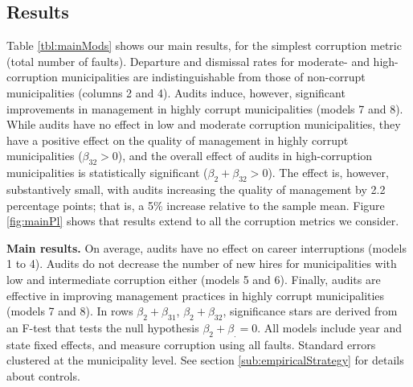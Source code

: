 \documentclass[12pt,a4paper]{article}
\theoremstyle{definition}
\begin{document}
\subsection{Results}
\label{sub:results}

Table \ref{tbl:mainMods} shows our main results, for the simplest corruption metric (total number of faults). Departure and dismissal rates for moderate- and high-corruption municipalities are indistinguishable from those of non-corrupt municipalities (columns 2 and 4). %
Audits induce, however, significant improvements in management in highly corrupt municipalities (models 7 and 8). While audits have no effect in low and moderate corruption municipalities, they have a positive effect on the quality of management in highly corrupt municipalities ($\beta_{32} > 0$), and the overall effect of audits in high-corruption municipalities is statistically significant ($\beta_2 + \beta_{32} > 0$). The effect is, however, substantively small, with audits increasing the quality of management by 2.2 percentage points; that is, a 5\% increase relative to the sample mean. Figure \ref{fig:mainPl} shows that results extend to all the corruption metrics we consider. 

\begin{landscape}
    \begin{table}[t]
        \centering
        \footnotesize
        
        \caption{{\bf Main results.} On average, audits have no effect on career interruptions (models 1 to 4). Audits do not decrease the number of new hires for municipalities with low and intermediate corruption either (models 5 and 6). Finally, audits are effective in improving management practices in highly corrupt municipalities (models 7 and 8). In rows $\beta_2 + \beta_{31}$, $\beta_2 + \beta_{32}$, significance stars are derived from an F-test that tests the null hypothesis $\beta_2 + \beta_. = 0$. All models include year and state fixed effects, and measure corruption using all faults. Standard errors clustered at the municipality level. See section \ref{sub:empiricalStrategy} for details about controls.}
        \label{tbl:mainMods}
    \end{table}    
\end{landscape}
\end{document}
